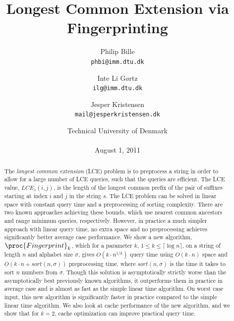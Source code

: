 \documentclass[a4]{article}
\title{Longest Common Extension via Fingerprinting}
\author{Philip Bille\\\texttt{phbi@imm.dtu.dk}\and Inte Li Gørtz\\\texttt{ilg@imm.dtu.dk}\and Jesper Kristensen\\\texttt{mail@jesperkristensen.dk}}
\date{Technical University of Denmark\\\hfill\\August 1, 2011}
\begin{document}
\maketitle

\newcommand{\sortt}{\textit{sort}(n,\sigma)}
\newcommand{\LCE}{\textit{LCE}}
\newcommand{\NCA}{\textit{NCA}}
\newcommand{\RMQ}{\textit{RMQ}}
\newcommand{\SA}{\textit{SA}}
\newcommand{\SAinv}{\textit{SA}^{-1}} %
\newcommand{\SAi}{SA$^{-1}$} %
\newcommand{\LCP}{\textit{LCP}}
\newcommand{\LA}{\textit{LA}}
\newcommand{\suff}{\textit{suff}}
\newcommand{\logceil}{\lceil\log n\rceil}
\newcommand{\fprint}[1][k]{\ensuremath{\proc{Fingerprint}_{#1}}}
\newcommand{\fprintk}{\fprint[k]}
\newcommand{\RMQpq}[2]{RMQ\textless$#1$, $#2$\textgreater}
\newcommand{\RMQn}{\RMQpq{1}{n}}
\newcommand{\RMQq}{\RMQpq{n}{1}}
\newcommand{\RMQlog}{\RMQpq{n}{\log n}}





\begin{abstract}
The \emph{longest common extension} (LCE) problem is to preprocess a string in order to allow for a large number of LCE queries, such that the queries are efficient. The LCE value, $\LCE_s(i,j)$, is the length of the longest common prefix of the pair of suffixes starting at index $i$ and $j$ in the string $s$. The LCE problem can be solved in linear space with constant query time and a preprocessing of sorting complexity. There are two known approaches achieving these bounds, which use nearest common ancestors and range minimum queries, respectively. However, in practice a much simpler approach with linear query time, no extra space and no preprocessing achieves significantly better average case performance. We show a new algorithm, \fprintk, which for a parameter $k$, $1\leq k\leq\logceil$, on a string of length $n$ and alphabet size $\sigma$, gives $O(k\cdot n^{1/k})$ query time using $O(k\cdot n)$ space and $O(k\cdot n + \sortt)$ preprocessing time, where $\sortt$ is the time it takes to sort $n$ numbers from $\sigma$. Though this solution is asymptotically strictly worse than the asymptotically best previously known algorithms, it outperforms them in practice in average case and is almost as fast as the simple linear time algorithm. On worst case input, this new algorithm is significantly faster in practice compared to the simple linear time algorithm. We also look at cache performance of the new algorithm, and we show that for $k=2$, cache optimization can improve practical query time.
\end{abstract}
\end{document}
